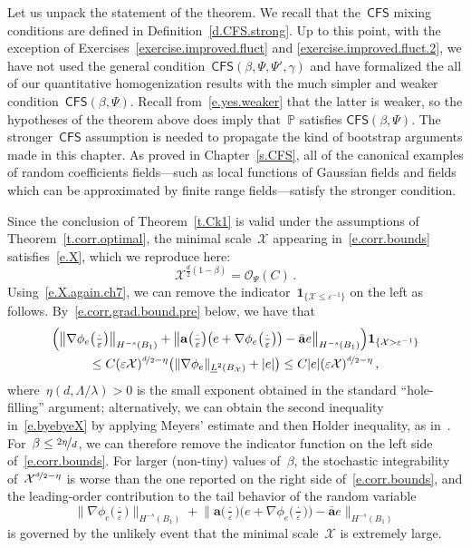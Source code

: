 \documentclass[11pt,twoside]{article} %
\numberwithin{equation}{section}
\theoremstyle{definition}
\newcommand{\eps}{\varepsilon}
\newcommand{\ep}{\eps}
\renewcommand{\a}{\mathbf{a}}
\newcommand{\ahom}{\bar{\a}}
\renewcommand{\P}{\mathbb{P}}
\newcommand{\X}{\mathcal{X}}
\renewcommand{\O}{\mathcal{O}}
\newcommand{\indc}{\boldsymbol{1}}
\newcommand{\CFS}{\mathsf{CFS}}
\begin{document}
Let us unpack the statement of the theorem. 
We recall that the~$\CFS$ mixing conditions are defined in Definition~\ref{d.CFS.strong}. Up to this point, with the exception of Exercises~\ref{exercise.improved.fluct} and \ref{exercise.improved.fluct.2}, we have not used the general condition~$\CFS(\beta,\Psi,\Psi',\gamma)$ and have formalized the all of our quantitative homogenization results with the much simpler and weaker condition~$\CFS(\beta,\Psi)$. Recall from~\eqref{e.yes.weaker} that the latter is weaker, so the hypotheses of the theorem above does imply that~$\P$ satisfies $\CFS(\beta,\Psi)$. The stronger~$\CFS$ assumption is needed to propagate the kind of bootstrap arguments made in this chapter. As proved in Chapter~\ref{s.CFS}, all of the canonical examples of random coefficients fields---such as local functions of Gaussian fields and fields which can be approximated by finite range fields---satisfy the stronger condition. 

\smallskip

Since the conclusion of Theorem~\ref{t.Ck1} is valid under the assumptions of Theorem~\ref{t.corr.optimal}, the minimal scale~$\X$ appearing in~\eqref{e.corr.bounds} satisfies~\eqref{e.X}, which we reproduce here:
\begin{equation}
\label{e.X.again.ch7}
\X^{\frac d2(1-\beta)  } 
= 
\O_{\Psi}(C) 
\,.
\end{equation}
Using~\eqref{e.X.again.ch7}, we can remove the indicator~$\indc_{\{ \X \leq \ep^{-1} \}}$ on the left as follows. 
By~\eqref{e.corr.grad.bound.pre} below, we have that
\begin{multline}  
\label{e.byebyeX}
\Bigl( \big\| \nabla \phi_e\bigl( \tfrac{\cdot}{\ep} \bigr)  \bigr\|_{H^{-s}(B_1)}  + \big\| \a\bigl( \tfrac{\cdot}{\ep} \bigr)\bigl( e + \nabla \phi_e\bigl( \tfrac{\cdot}{\ep} \bigr) \bigr) - \ahom e \bigr\|_{H^{-s}(B_1)}
\Bigr) 
\indc_{\{ \X > \ep^{-1} \} } 
\\ 
\leq 
C(\ep \X)^{\nicefrac d2-\eta}
\bigl( \| \nabla \phi_e\|_{\underline{L}^2(B_{\X})} + |e| \bigr)
\leq 
C |e| (\ep \X)^{\nicefrac d2-\eta}
\,,
\end{multline}
where~$\eta(d,\Lambda/\lambda)>0$ is the small exponent obtained in the standard ``hole-filling'' argument; alternatively, we can obtain the second inequality in~\eqref{e.byebyeX} by applying Meyers' estimate and then Holder inequality, as in~\cite[Lemma 3.17]{AKMBook}.
For~$\beta\leq \nicefrac{2\eta}{d}$, we can therefore remove the indicator function on the left side of~\eqref{e.corr.bounds}. 
For larger (non-tiny) values of~$\beta$, 
the stochastic integrability of~$\X^{\nicefrac d2-\eta}$ is worse than the one reported on the right side of~\eqref{e.corr.bounds}, and the leading-order contribution to the tail behavior of the random variable
\begin{equation*}
\big\| \nabla \phi_e\bigl( \tfrac{\cdot}{\ep} \bigr)  \bigr\|_{H^{-s}(B_1)}  + \big\| \a\bigl( \tfrac{\cdot}{\ep} \bigr)\bigl( e + \nabla \phi_e\bigl( \tfrac{\cdot}{\ep} \bigr) \bigr) - \ahom e \bigr\|_{H^{-s}(B_1)} 
\end{equation*}
is governed by the unlikely event that the minimal scale~$\X$ is extremely large.
\end{document}
